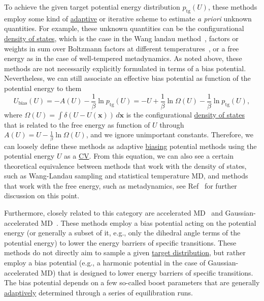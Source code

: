 \documentclass[9pt,review]{livecoms}
\newcommand{\vx}{\mathbf{x}}
\begin{document}
To achieve the given target potential energy distribution $p_{\mathrm{tg}}(U)$, these methods employ some kind of \hyperlink{ref:Adaptive} {adaptive} or iterative scheme to estimate \textit{a priori} unknown quantities. For example, these unknown quantities can be the configurational \hyperlink{ref:density_of_states}{density of states}, which is the case in the Wang landau method~\cite{wang-landau:prl:2001:wang-landau,Kim2006_PRL_STMD,DePablo_DOS_2012}, factors or weights in sum over Boltzmann factors at different temperatures~\cite{Gao_ITS_2008,invernizzi2020unified}, or a free energy as in the case of well-tempered metadynamics. As noted above, these methods are not necessarily explicitly formulated in terms of a bias potential. Nevertheless, we can still associate an effective bias potential as function of the potential energy to them
\begin{equation}
U_\mathrm{bias}(U) = - A(U) -\frac{1}{\beta} \ln p_{\mathrm{tg}}(U) = - U + \frac{1}{\beta} \ln \Omega(U) -\frac{1}{\beta} \ln p_{\mathrm{tg}}(U),
\end{equation}
where $\Omega(U) = \int \delta(U-U(\vx)) \, d\vx$ is the configurational \hyperlink{ref:density_of_states}{density of states} that is related to the free energy as function of $U$ through $A(U)=U - \frac{1}{\beta} \ln \Omega(U)$, and we ignore unimportant constants. Therefore, we can loosely define these methods as adaptive \hyperlink{ref:biasingE} {biasing} potential methods using the potential energy $U$ as a \hyperlink{ref:CV} {CV}. From this equation, we can also see a certain theoretical equivalence between methods that work with the density of states, such as Wang-Landau sampling and statistical temperature MD, and methods that work with the free energy, such as metadynamics, see Ref~\cite{Junghans2014wte-wl} for further discussion on this point.

Furthermore, closely related to this category are accelerated MD~\cite{Hamelberg2004} and Gaussian-accelerated MD~\cite{Miao2017, Wang2021}. These methods employ a bias potential acting on the potential energy (or generally a subset of it, e.g., only the dihedral angle terms of the potential energy) to lower the energy barriers of specific transitions. These methods do not directly aim to sample a given \hyperlink{ref:targetdist} {target distribution}, but rather employ a bias potential (e.g., a harmonic potential in the case of Gaussian-accelerated MD) that is designed to lower energy barriers of specific transitions. The bias potential depends on a few so-called boost parameters that are generally \hyperlink{ref:Adaptive} {adaptively} determined through a series of equilibration runs.
\end{document}
